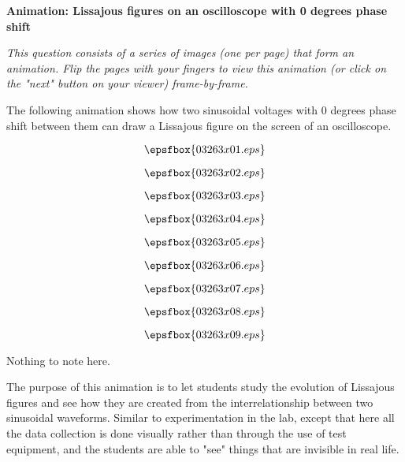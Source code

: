 

\centerline{\bf Animation: Lissajous figures on an oscilloscope with 0 degrees phase shift}

\vskip 10pt

{\it This question consists of a series of images (one per page) that form an animation.  Flip the pages with your fingers to view this animation (or click on the "next" button on your viewer) frame-by-frame.}

\vskip 10pt

The following animation shows how two sinusoidal voltages with 0 degrees phase shift between them can draw a Lissajous figure on the screen of an oscilloscope.

\vfil \eject
$$\epsfbox{03263x01.eps}$$

\vfil \eject
$$\epsfbox{03263x02.eps}$$

\vfil \eject
$$\epsfbox{03263x03.eps}$$

\vfil \eject
$$\epsfbox{03263x04.eps}$$

\vfil \eject
$$\epsfbox{03263x05.eps}$$

\vfil \eject
$$\epsfbox{03263x06.eps}$$

\vfil \eject
$$\epsfbox{03263x07.eps}$$

\vfil \eject
$$\epsfbox{03263x08.eps}$$

\vfil \eject
$$\epsfbox{03263x09.eps}$$


\vfil \eject







Nothing to note here.







The purpose of this animation is to let students study the evolution of Lissajous figures and see how they are created from the interrelationship between two sinusoidal waveforms.  Similar to experimentation in the lab, except that here all the data collection is done visually rather than through the use of test equipment, and the students are able to "see" things that are invisible in real life.




